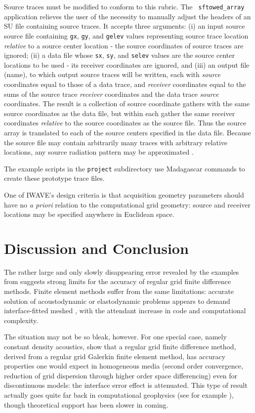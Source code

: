 Source traces must be modified to conform to this rubric. The {\tt
  sftowed\_array} application relieves the user of the necessity to
manually adjust the headers of an SU file containing source traces. It
accepts three arguments: (i) an input source source file containing {\tt gx}, {\tt gy}, and {\tt gelev}
values representing source trace location {\em relative} to a source
center location - the 
source coordinates of source traces are ignored; (ii)
a data file whose {\tt sx}, {\tt sy}, and {\tt selev} values are the
source center locations to be used - its receiver coordinates are ignored, and (iii) an output file (name), 
to which output source traces will be written, each with {\em source}
coordinates equal to those of a data trace, and {\em receiver}
coordinates equal to the sums of the source trace {\em receiver}
coordinates and the data trace {\em source} coordinates. The result is
a collection of source coordinate gathers with the same source
coordinates as the data file, but within each gather the same receiver
coordinates {\em relative} to the source coordinates as the source
file. Thus the source array is translated to each of the source
centers specified in the data file. Because the source file may
contain arbitrarily many traces with arbitrary relative locations, any
source radiation pattern may be approximated \cite[]{SantosaSymes:00}. 

The example scripts in the {\tt project}
subdirectory use Madagascar
commands to create these prototype trace files.

One of IWAVE's design criteria is that acquisition geometry parameters
should have no {\em a priori} relation to the computational grid geometry:
source and receiver locations may be specified anywhere in Euclidean
space. 

\section{Discussion and Conclusion}
The rather large and only slowly disappearing error revealed by the
examples from \cite{SymesVdovina:09} suggests strong limits for the
accuracy of regular grid finite difference methods. Finite element
methods suffer from the same limitations: accurate solution of
acoustodynamic or elastodynamic problems appears to demand
interface-fitted meshed \cite[]{Cohen:01}, with the attendant increase
in code and computational complexity.

The situation may not be so bleak, however. For one special case,
namely constant density acoustics, 
\cite{Terentyev:09} show that a regular grid finite difference method,
derived from a regular grid Galerkin finite element method, has
accuracy properties one would expect in homogeneous media (second
order convergence, reduction of grid dispersion through higher order
space differencing) even for discontinuous models: the interface error
effect is attenuated. This type of result actually goes quite far back
in computational geophysics (see for example \cite{Muiretal:92}),
though theoretical support has been slower in coming.

